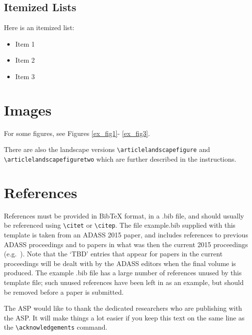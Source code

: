 \documentclass[11pt,twoside]{article}
\begin{document}
\subsection{Itemized Lists}
Here is an itemized list:
\begin{itemize}
\item Item 1
\item Item 2
\item Item 3
\end{itemize}


\section{Images}
For some figures, see Figures \ref{ex_fig1}- \ref{ex_fig3}.




\clearpage %

There are also the landscape versions \verb"\articlelandscapefigure" and \\
\verb"\articlelandscapefiguretwo" which are further described in the instructions.

\section{References}
References must be provided in BibTeX format, in a .bib file, and should usually be referenced using \verb"\citet" or \verb"\citep". The file example.bib supplied with this template is taken from an ADASS 2015 paper, and includes references to previous ADASS proceedings 
\citep[such as][]{1999ASPC..172..487P} and to papers in what was then the current 2015 proceedings (e.g.\ \citet{O11-4_adassxxv}). Note that the `TBD' entries that appear for papers in the current proceedings will be dealt with by the ADASS editors when the final volume is produced. The example .bib file has a large number of references unused by this template file; such unused references have been left in as an example, but should be removed before a paper is submitted.

\acknowledgements The ASP would like to thank the dedicated researchers who are publishing with the ASP.  It will make things a lot easier if you keep this text on the same line as the \verb"\acknowledgements" command.


\end{document}

